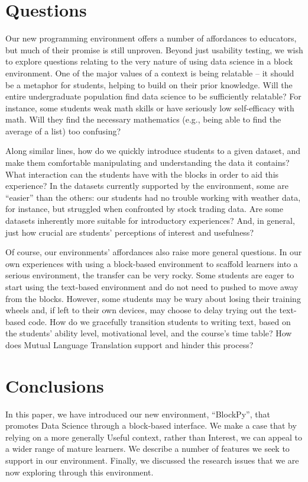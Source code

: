 \documentclass{sig-alternate}
\begin{document}
	
\section{Questions}

Our new programming environment offers a number of affordances to educators, but much of their promise is still unproven.
Beyond just usability testing, we wish to explore questions relating to the very nature of using data science in a block environment.
One of the major values of a context is being relatable -- it should be a metaphor for students, helping to build on their prior knowledge. Will the entire undergraduate population find data science to be sufficiently relatable? For instance, some students weak math skills or have seriously low self-efficacy with math. Will they find the necessary mathematics (e.g., being able to find the average of a list) too confusing?

Along similar lines, how do we quickly introduce students to a given dataset, and make them comfortable manipulating and understanding the data it contains?
What interaction can the students have with the blocks in order to aid this experience?
In the datasets currently supported by the environment, some are ``easier'' than the others: our students had no trouble working with weather data, for instance, but struggled when confronted by stock trading data.
Are some datasets inherently more suitable for introductory experiences?
And, in general, just how crucial are students' perceptions of interest and usefulness? 

Of course, our environments' affordances also raise more general questions.
In our own experiences with using a block-based environment to scaffold learners into a serious environment, the transfer can be very rocky.
Some students are eager to start using the text-based environment and do not need to pushed to move away from the blocks.
However, some students may be wary about losing their training wheels and, if left to their own devices, may choose to delay trying out the text-based code.
How do we gracefully transition students to writing text, based on the students' ability level, motivational level, and the course's time table?
How does Mutual Language Translation support and hinder this process?

\section{Conclusions}

In this paper, we have introduced our new environment, ``BlockPy'', that promotes Data Science through a block-based interface.
We make a case that by relying on a more generally Useful context, rather than Interest, we can appeal to a wider range of mature learners.
We describe a number of features we seek to support in our environment.
Finally, we discussed the research issues that we are now exploring through this environment.


\end{document}
